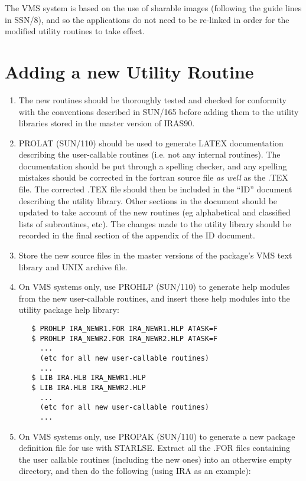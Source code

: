 The {\small VMS} system is based on the use of sharable images (following
the guide lines in SSN/8), and so the applications do not need to be re-linked
in order for the modified utility routines to take effect.

\section{Adding a new Utility Routine}
\begin{enumerate}
\item The new routines should be thoroughly tested and checked for conformity
with the conventions described in SUN/165 before adding them to the
utility libraries stored in the master version of {\small IRAS90}.

\item {\small PROLAT} (SUN/110) should be used to generate {\small LATEX}
documentation describing the user-callable routines (i.e. not any internal
routines). The documentation should be put through a spelling checker, and any
spelling mistakes should be corrected in the fortran source file {\em as well}
as the {\small .TEX} file. The corrected {\small .TEX} file should then be
included in the ``{\small ID}'' document describing the utility library. Other
sections in the document should be updated to take account of the new routines
(eg alphabetical and classified lists of subroutines, etc). The changes made to
the utility library should be recorded in the final section of the appendix of
the {\small ID} document.

\item Store the new source files in the master versions of the package's {\small
VMS} text library and {\small UNIX} archive file.

\item On {\small VMS} systems only, use {\small PROHLP} (SUN/110) to generate
help modules from the new user-callable routines, and insert these help modules
into the utility package help library:

\small
\begin{verbatim}
   $ PROHLP IRA_NEWR1.FOR IRA_NEWR1.HLP ATASK=F
   $ PROHLP IRA_NEWR2.FOR IRA_NEWR2.HLP ATASK=F
     ...
     (etc for all new user-callable routines)
     ...
   $ LIB IRA.HLB IRA_NEWR1.HLP
   $ LIB IRA.HLB IRA_NEWR2.HLP
     ...
     (etc for all new user-callable routines)
     ...
\end{verbatim}
\normalsize

\item On {\small VMS} systems only, use {\small PROPAK} (SUN/110) to generate a
new package definition file for use with {\small STARLSE}. Extract all the
{\small .FOR} files containing the user callable routines (including the new
ones) into an otherwise empty directory, and then do the following (using
{\small IRA} as an example):


\end{enumerate}
